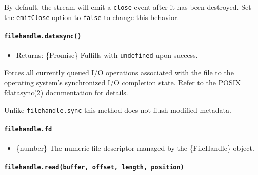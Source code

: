 By default, the stream will emit a
\texttt{\textquotesingle{}close\textquotesingle{}} event after it has
been destroyed. Set the \texttt{emitClose} option to \texttt{false} to
change this behavior.

\paragraph{\texorpdfstring{\texttt{filehandle.datasync()}}{filehandle.datasync()}}\label{filehandle.datasync}

\begin{itemize}
\tightlist
\item
  Returns: \{Promise\} Fulfills with \texttt{undefined} upon success.
\end{itemize}

Forces all currently queued I/O operations associated with the file to
the operating system's synchronized I/O completion state. Refer to the
POSIX fdatasync(2) documentation for details.

Unlike \texttt{filehandle.sync} this method does not flush modified
metadata.

\paragraph{\texorpdfstring{\texttt{filehandle.fd}}{filehandle.fd}}\label{filehandle.fd}

\begin{itemize}
\tightlist
\item
  \{number\} The numeric file descriptor managed by the \{FileHandle\}
  object.
\end{itemize}

\paragraph{\texorpdfstring{\texttt{filehandle.read(buffer,\ offset,\ length,\ position)}}{filehandle.read(buffer, offset, length, position)}}\label{filehandle.readbuffer-offset-length-position}

